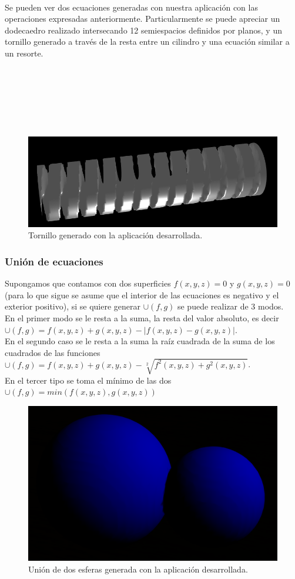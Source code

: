 \documentclass[12pt]{article}
\begin{document}
\\Se pueden ver dos ecuaciones generadas con nuestra aplicación con las operaciones expresadas anteriormente. Particularmente se puede apreciar un dodecaedro realizado intersecando 12 semiespacios definidos por planos, y un tornillo generado a través de la resta entre un cilindro  y una ecuación similar a un resorte.
\\
\\
\\
\\
\\
\\
\\

\begin{figure}[h]
\includegraphics[width=0.7\linewidth,center]{tornillo.png}
\caption{Tornillo generado con la aplicación desarrollada.}
\end{figure}
\subsubsection{Unión de ecuaciones}
Supongamos que contamos con dos superficies $f(x,y,z)=0$ y $g(x,y,z)=0$ (para lo que sigue se asume que el interior de las ecuaciones es negativo y el exterior positivo), si se quiere generar  $\cup(f,g)$ se puede realizar de 3 modos. 
\\En el primer modo se le resta a la suma, la resta del valor absoluto, es decir $\cup(f,g) =  f(x,y,z) + g(x,y,z) - |f(x,y,z) - g(x,y,z)|$. 
\\En el segundo caso se le resta a la suma la raíz cuadrada de la suma de los cuadrados de las funciones  $\cup(f,g) = f(x,y,z) + g(x,y,z) -\sqrt[2]{f^2(x,y,z) + g^2(x,y,z)}$.
\\En el tercer tipo se toma el mínimo de las dos  $\cup(f,g)=min(f(x,y,z),g(x,y,z))$
\clearpage
\begin{figure}[h]
\includegraphics[width=\linewidth,center]{oi1.png}
\caption{Unión de dos esferas generada con la aplicación desarrollada.}
\end{figure}
\end{document}
